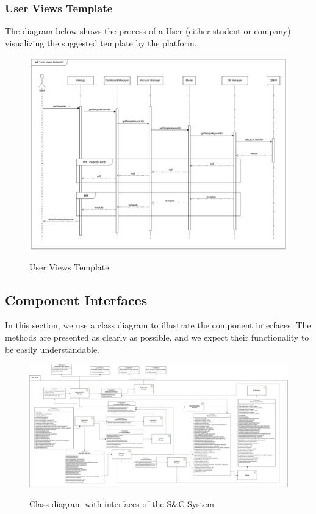 \documentclass[a4paper,12pt]{article}
\begin{document}
\subsubsection*{User Views Template}
The diagram below shows the process of a User (either student or company) visualizing the suggested template by the platform.
\begin{figure}[H]
\centering
\includegraphics[scale = 0.5]{DD_figures/RuntimeView/UserViewsTemplateRV.png}\\
\caption{User Views Template}
\end{figure}


\newpage
\subsection{Component Interfaces}
In this section, we use a class diagram to illustrate the component interfaces. The methods are presented as clearly as possible, and we expect their functionality to be easily understandable.
\begin{figure}
\centering
\includegraphics[scale = 0.3]{DD_figures/ComponentInterfaces.drawio.png}\\
\caption{Class diagram with interfaces of the S\&C System}
\end{figure}
\end{document}
